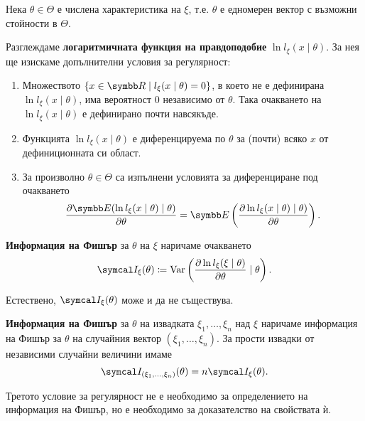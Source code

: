 \documentclass[numbers=endperiod, bibliography=totocnumbered]{scrartcl}
\begin{document}
\begin{definition}\label{def:fisher_information}
  Нека \( \theta \in \Theta \) е числена характеристика на \( \xi \), т.е. \( \theta \) е едномерен вектор с възможни стойности в \( \Theta \).

  Разглеждаме \textbf{логаритмичната функция на правдоподобие} \( \ln l_\xi(x \mid \theta) \). За нея ще изискаме допълнителни условия за регулярност:
  \begin{enumerate}
    \item Множеството \( \{ x \in \R \mid l_\xi(x \mid \theta) = 0 \} \), в което не е дефинирана \( \ln l_\xi(x \mid \theta) \), има вероятност \( 0 \) независимо от \( \theta \). Така очакването на \( \ln l_\xi(x \mid \theta) \) е дефинирано почти навсякъде.
    \item Функцията \( \ln l_\xi(x \mid \theta) \) е диференцируема по \( \theta \) за (почти) всяко \( x \) от дефиниционната си област.
    \item За произволно \( \theta \in \Theta \) са изпълнени условията за диференциране под очакването
    \begin{equation*}
      \frac {\partial \Expect(\ln l_\xi(x \mid \theta) \mid \theta)} {\partial \theta}
      =
      \Expect\left( \frac {\partial \ln l_\xi(x \mid \theta) \mid \theta)} {\partial \theta} \right).
    \end{equation*}
  \end{enumerate}

  \textbf{Информация на Фишър} за \( \theta \) на \( \xi \) наричаме очакването
  \begin{equation*}
    \FisherInfo_\xi(\theta) \coloneqq \Var\left( \frac {\partial \ln l_\xi(\xi \mid \theta)} {\partial \theta} \mid \theta \right).
  \end{equation*}

  Естествено, \( \FisherInfo_\xi(\theta) \) може и да не съществува.

  \textbf{Информация на Фишър} за \( \theta \) на извадката \( \xi_1, \ldots, \xi_n \) над \( \xi \) наричаме информация на Фишър за \( \theta \) на случайния вектор \( (\xi_1, \ldots, \xi_n) \). За прости извадки от независими случайни величини имаме
  \begin{equation*}
    \FisherInfo_{(\xi_1, \ldots, \xi_n)}(\theta) = n \FisherInfo_\xi(\theta).
  \end{equation*}
\end{definition}

\begin{remark}
  Третото условие за регулярност не е необходимо за определението на информация на Фишър, но е необходимо за доказателство на свойствата ѝ.
\end{remark}
\end{document}
